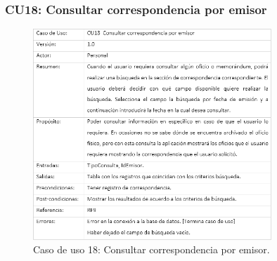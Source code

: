 \subsubsection{CU18: Consultar correspondencia por emisor}
\begin{figure}[htbp!]
		\centering
			\includegraphics[width=0.8\textwidth]{images/CU/CU18}
		\caption{Caso de uso 18: Consultar correspondencia por emisor.}
		\label{Tabla}
	\end{figure}
	

